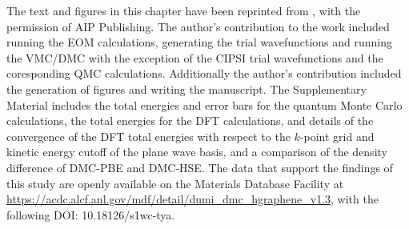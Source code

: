 The text and figures in this chapter have been reprinted from , with the permission of AIP Publishing.
The author's contribution to the work included running the EOM calculations, generating the trial wavefunctions and running the VMC/DMC with the exception of the CIPSI trial wavefunctions and the coresponding QMC calculations. Additionally the author's contribution included the generation of figures and writing the manuscript.
The Supplementary Material includes the total energies and error bars for the quantum Monte Carlo calculations, the total energies for the DFT calculations, and details of the convergence of the DFT total energies with respect to the $k$-point grid and kinetic energy cutoff of the plane wave basis, and a comparison of the density difference of DMC-PBE and DMC-HSE.
 The data that support the findings of this study are openly available on the Materials Database Facility at \url{https://acdc.alcf.anl.gov/mdf/detail/dumi_dmc_hgraphene_v1.3}, with the following DOI: 10.18126/s1wc-tya.
